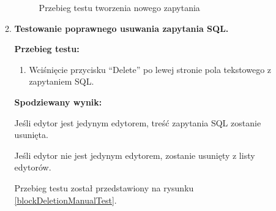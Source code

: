 \begin{enumerate}
\begin{enumerate}
\begin{figure}[h]
                    \caption{Przebieg testu tworzenia nowego zapytania}
                    \label{newBlockCreationManualTest}
                \end{figure}

                \FloatBarrier

            \item \textbf{Testowanie poprawnego usuwania zapytania SQL.}

                \textbf{Przebieg testu:}

                \begin{enumerate}

                    \item Wciśnięcie przycisku ``Delete'' po lewej stronie pola
                        tekstowego z zapytaniem SQL.

                \end{enumerate}

                \textbf{Spodziewany wynik:}

                Jeśli edytor jest jedynym edytorem, treść zapytania SQL zostanie
                usunięta.

                Jeśli edytor nie jest jedynym edytorem, zostanie usunięty z
                listy edytorów.

                Przebieg testu został przedstawiony na rysunku \ref{blockDeletionManualTest}.

                \begin{figure}[h]
                    \centering


\end{figure}
\end{enumerate}
\end{enumerate}
